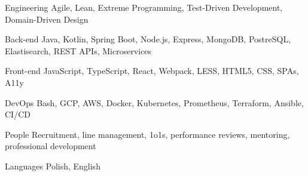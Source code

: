 

\begin{cvskills}

  \cvskill
  {Engineering} %
  {Agile, Lean, Extreme Programming, Test-Driven Development, Domain-Driven Design} %

  \cvskill
    {Back-end} %
    {Java, Kotlin, Spring Boot, Node.js, Express, MongoDB, PostreSQL, Elastisearch, REST APIs, Microservices} %

  \cvskill
    {Front-end} %
    {JavaScript, TypeScript, React, Webpack, LESS, HTML5, CSS, SPAs, A11y} %

  \cvskill
  {DevOps} %
  {Bash, GCP, AWS, Docker, Kubernetes, Prometheus, Terraform, Ansible, CI/CD} %

  \cvskill
    {People} %
    {Recruitment, line management, 1o1s, performance reviews, mentoring, professional development} %

  \cvskill
    {Languages} %
    {Polish, English} %

\end{cvskills}
